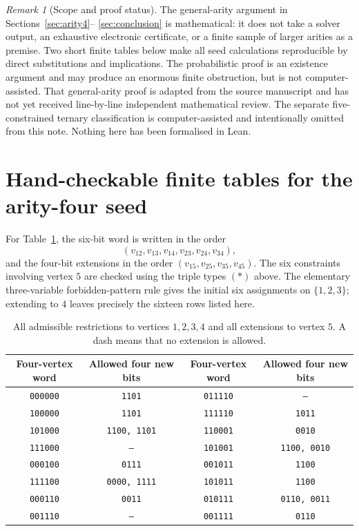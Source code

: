 \documentclass[11pt,a4paper]{article}
\theoremstyle{remark}
\newtheorem{remark}[theorem]{Remark}
\begin{document}
\begin{remark}[Scope and proof status]
The general-arity argument in Sections~\ref{sec:arity4}--
\ref{sec:conclusion} is mathematical: it does not take a solver output,
an exhaustive electronic certificate, or a finite sample of larger
arities as a premise.  Two short finite tables below
make all seed calculations reproducible by direct substitutions and
implications.  The probabilistic proof is an existence argument and
may produce an enormous finite obstruction, but is not
computer-assisted.  That general-arity proof is adapted from the source manuscript and
has not yet received line-by-line independent mathematical review.
The separate five-constrained ternary classification is
computer-assisted and intentionally omitted from this note.
Nothing here has been formalised in Lean.
\end{remark}



\appendix

\clearpage
\section{Hand-checkable finite tables for the arity-four seed}
\label{app:four-tables}
For Table~\ref{tab:n4extend}, the six-bit word is written in the order
\[
 (v_{12},v_{13},v_{14},v_{23},v_{24},v_{34}),
\]
and the four-bit extensions in the order
$(v_{15},v_{25},v_{35},v_{45})$.  The six constraints involving
vertex $5$ are checked using the triple types $(*)$ above.
The elementary three-variable forbidden-pattern rule gives the
initial six assignments on $\{1,2,3\}$; extending to $4$
leaves precisely the sixteen rows listed here.

\begin{table}[htbp]\centering\small
\begin{tabular}{@{}cc|cc@{}}\toprule
Four-vertex word&Allowed four new bits&Four-vertex word&Allowed four new bits\\\midrule
\texttt{000000}&\texttt{1101}&\texttt{011110}&\texttt{--}\\
\texttt{100000}&\texttt{1101}&\texttt{111110}&\texttt{1011}\\
\texttt{101000}&\texttt{1100, 1101}&\texttt{110001}&\texttt{0010}\\
\texttt{111000}&\texttt{--}&\texttt{101001}&\texttt{1100, 0010}\\
\texttt{000100}&\texttt{0111}&\texttt{001011}&\texttt{1100}\\
\texttt{111100}&\texttt{0000, 1111}&\texttt{101011}&\texttt{1100}\\
\texttt{000110}&\texttt{0011}&\texttt{010111}&\texttt{0110, 0011}\\
\texttt{001110}&\texttt{--}&\texttt{001111}&\texttt{0110}\\
\bottomrule\end{tabular}
\caption{All admissible restrictions to vertices $1,2,3,4$ and all extensions to vertex $5$.  A dash means that no extension is allowed.}\label{tab:n4extend}
\end{table}
\end{document}
